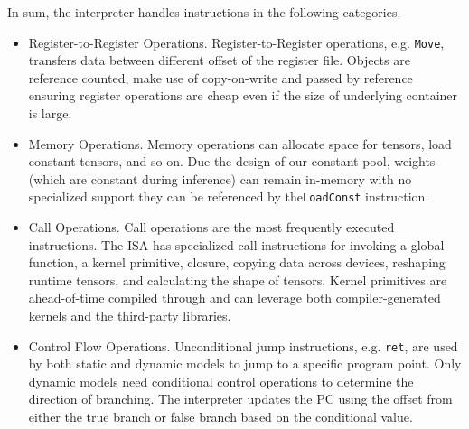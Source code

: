 In sum, the interpreter handles instructions in the following categories.

\begin{itemize}[leftmargin=*]
    \item Register-to-Register Operations. Register-to-Register operations, e.g. \texttt{Move}, transfers data between different offset of the register file. Objects are reference counted, make use of copy-on-write and passed by reference ensuring register operations are cheap even if the size of underlying container is large.

    \item Memory Operations. Memory operations can allocate space for tensors, load constant tensors, and so on. Due the design of our constant pool, weights (which are constant during inference) can remain in-memory with no specialized support they can be referenced by the\texttt{LoadConst} instruction.

    \item Call Operations. Call operations are the most frequently executed instructions. The ISA
    has specialized call instructions for invoking a global function, a kernel primitive, closure, copying data across devices, reshaping runtime tensors, and calculating the shape of tensors. Kernel primitives are ahead-of-time compiled through and can leverage both compiler-generated kernels and the third-party libraries.

    \item Control Flow Operations. Unconditional jump instructions, e.g. \texttt{ret}, are used by both static and dynamic models to jump to a specific program point. Only dynamic models need conditional control operations to determine the direction of branching. The interpreter updates the PC using the offset from either the true branch or false branch based on the conditional value.
\end{itemize}

